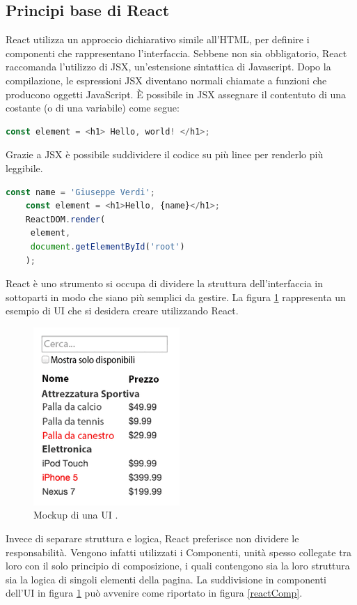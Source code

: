 \subsection{Principi base di React}
\label{sub:princReact}
\noindent React utilizza un approccio dichiarativo simile all’HTML, per definire i componenti che rappresentano l’interfaccia.\newline
Sebbene non sia obbligatorio, React raccomanda l'utilizzo di JSX, un'estensione sintattica di Javascript.\newline
Dopo la compilazione, le espressioni JSX diventano normali chiamate a funzioni che producono oggetti JavaScript. È possibile in JSX assegnare il contentuto di una costante (o di una variabile) come segue:
\begin{lstlisting}[language=Javascript]
    const element = <h1> Hello, world! </h1>;
\end{lstlisting}
Grazie a JSX è possibile suddividere il codice su più linee per renderlo più leggibile.
\begin{lstlisting}[language=Javascript]
    const name = 'Giuseppe Verdi';
    const element = <h1>Hello, {name}</h1>;
    ReactDOM.render(
     element,
     document.getElementById('root')
    );
\end{lstlisting}

\noindent React è uno strumento si occupa di dividere la struttura dell'interfaccia in sottoparti in modo che siano più semplici da gestire.\newline
La figura \ref{reactMock} rappresenta un esempio di UI che si desidera creare utilizzando React.
\begin{figure}[H]
    \centering
    \includegraphics[width=0.4\linewidth]{img/thinking-in-react-mock.png}
    \caption{Mockup di una UI \cite{reactGetStart}.}
    \label{reactMock}
\end{figure}
\noindent Invece di separare struttura e logica, React preferisce non dividere le responsabilità.
\newline Vengono infatti utilizzati i Componenti, unità spesso collegate tra loro con il solo principio di composizione, i quali contengono sia la loro struttura sia la logica di singoli elementi della pagina.
La suddivisione in componenti dell'UI in figura \ref{reactMock} può avvenire come riportato in figura \ref{reactComp}.

